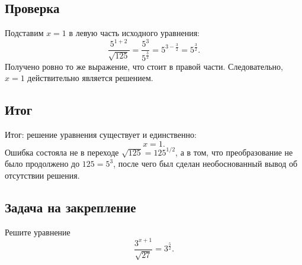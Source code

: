 \documentclass[12pt,a4paper]{article}
\begin{document}
\subsection*{Проверка}
Подставим $x=1$ в левую часть исходного уравнения:
\[
\frac{5^{1+2}}{\sqrt{125}}
=\frac{5^3}{5^{\frac32}}
=5^{3-\frac32}
=5^{\frac32}.
\]
Получено ровно то же выражение, что стоит в правой части. Следовательно, $x=1$ действительно является решением.

\subsection*{Итог}
\textcolor{teal!60!black}{Итог:} решение уравнения существует и единственно:
\[
\boxed{x=1}.
\]
Ошибка состояла не в переходе $\sqrt{125}=125^{1/2}$, а в том, что преобразование не было продолжено до $125=5^3$, после чего был сделан необоснованный вывод об отсутствии решения.

\subsection*{Задача на закрепление}
Решите уравнение
\[
\frac{3^{x+1}}{\sqrt{27}}=3^{\frac52}.
\]
\end{document}
